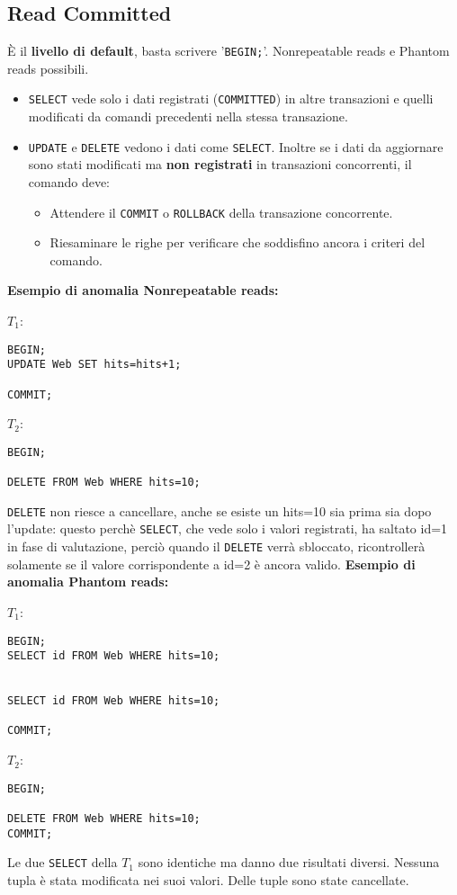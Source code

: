 \documentclass[a4paper, 10pt, titlepage]{article}
\begin{document}
		
		\subsection{Read Committed}
			È il \textbf{livello di default}, basta scrivere '\lstinline|BEGIN;|'. Nonrepeatable reads e Phantom reads possibili.
			\begin{itemize}
				\item \lstinline|SELECT| vede solo i dati registrati (\lstinline|COMMITTED|) in altre transazioni e quelli modificati da comandi precedenti nella stessa transazione.
				\item \lstinline|UPDATE| e \lstinline|DELETE| vedono i dati come \lstinline|SELECT|. Inoltre se i dati da aggiornare sono stati modificati ma \textbf{non registrati} in transazioni concorrenti, il comando deve:
				\begin{itemize}
					\item Attendere il \lstinline|COMMIT| o \lstinline|ROLLBACK| della transazione concorrente.
					\item Riesaminare le righe per verificare che soddisfino ancora i criteri del comando.
				\end{itemize}
			\end{itemize} \medskip
			\textbf{Esempio di anomalia Nonrepeatable reads:}
			\begin{multicols}{2}
				\noindent
				$ T_1 $:
				\begin{lstlisting}
BEGIN;
UPDATE Web SET hits=hits+1;

COMMIT;
				\end{lstlisting}
				\columnbreak
				$ T_2 $:
				\begin{lstlisting}
BEGIN;

DELETE FROM Web WHERE hits=10;

				\end{lstlisting}
			\end{multicols}
\lstinline|DELETE| non riesce a cancellare, anche se esiste un hits=10 sia prima sia dopo l'update: questo perchè \lstinline|SELECT|, che vede solo i valori registrati, ha saltato id=1 in fase di valutazione, perciò quando il \lstinline|DELETE| verrà sbloccato, ricontrollerà solamente se il valore corrispondente a id=2 è ancora valido. \newpage
\noindent
\textbf{Esempio di anomalia Phantom reads:}
			\begin{multicols}{2}
				\noindent
				$ T_1 $:
				\begin{lstlisting}
BEGIN;
SELECT id FROM Web WHERE hits=10;


SELECT id FROM Web WHERE hits=10;

COMMIT;
				\end{lstlisting}
				\columnbreak
				$ T_2 $:
				\begin{lstlisting}
BEGIN;

DELETE FROM Web WHERE hits=10;
COMMIT;
				\end{lstlisting}
			\end{multicols}
			Le due \lstinline|SELECT| della $T_1$ sono identiche ma danno due risultati diversi. Nessuna tupla è stata modificata nei suoi valori. Delle tuple sono state cancellate.
			
\end{document}
